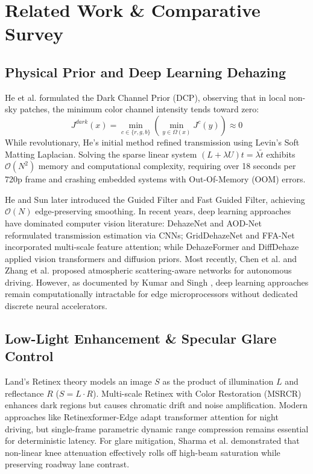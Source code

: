 \documentclass[conference]{IEEEtran}
\begin{document}
\section{Related Work \& Comparative Survey}

\subsection{Physical Prior and Deep Learning Dehazing}
He et al. \cite{he2010single} formulated the Dark Channel Prior (DCP), observing that in local non-sky patches, the minimum color channel intensity tends toward zero:
\begin{equation}
J^{dark}(x) = \min_{c \in \{r,g,b\}} \left( \min_{y \in \Omega(x)} J^c(y) \right) \approx 0
\label{eq:dcp}
\end{equation}
While revolutionary, He's initial method refined transmission using Levin's Soft Matting Laplacian. Solving the sparse linear system $(L + \lambda U)t = \lambda \tilde{t}$ exhibits $\mathcal{O}(N^2)$ memory and computational complexity, requiring over 18 seconds per 720p frame and crashing embedded systems with Out-Of-Memory (OOM) errors.

He and Sun \cite{he2013guided, he2015fastguided} later introduced the Guided Filter and Fast Guided Filter, achieving $\mathcal{O}(N)$ edge-preserving smoothing. In recent years, deep learning approaches have dominated computer vision literature: DehazeNet \cite{cai2016dehazenet} and AOD-Net \cite{li2017aodnet} reformulated transmission estimation via CNNs; GridDehazeNet \cite{liu2019griddehazenet} and FFA-Net \cite{qin2020ffa} incorporated multi-scale feature attention; while DehazeFormer \cite{guo2022dehazeformer} and DiffDehaze \cite{song2024diffdehaze} applied vision transformers and diffusion priors. Most recently, Chen et al. \cite{chen2024atmospheric} and Zhang et al. \cite{zhang2025realtime} proposed atmospheric scattering-aware networks for autonomous driving. However, as documented by Kumar and Singh \cite{kumar2025ultralow}, deep learning approaches remain computationally intractable for edge microprocessors without dedicated discrete neural accelerators.

\subsection{Low-Light Enhancement \& Specular Glare Control}
Land's Retinex theory \cite{land1977retinex} models an image $S$ as the product of illumination $L$ and reflectance $R$ ($S = L \cdot R$). Multi-scale Retinex with Color Restoration (MSRCR) \cite{jobson1997multiscale} enhances dark regions but causes chromatic drift and noise amplification. Modern approaches like Retinexformer-Edge \cite{wei2024retinexformer} adapt transformer attention for night driving, but single-frame parametric dynamic range compression remains essential for deterministic latency. For glare mitigation, Sharma et al. \cite{sharma2025dynamic} demonstrated that non-linear knee attenuation effectively rolls off high-beam saturation while preserving roadway lane contrast.
\end{document}
